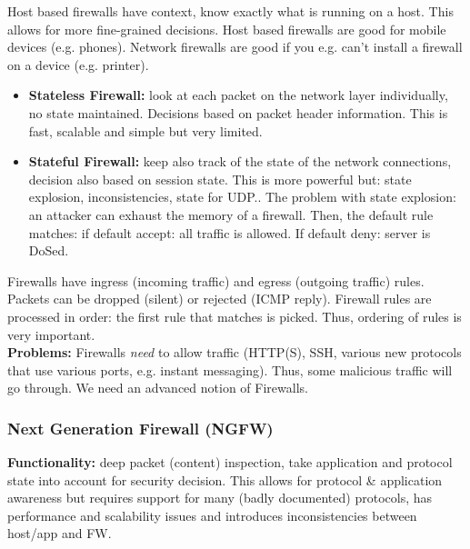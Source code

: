 \documentclass[11pt,oneside,a4paper]{article}
\begin{document}
\noindent Host based firewalls have context, know exactly what is running on a host. This allows for more fine-grained decisions. Host based firewalls are good for mobile devices (e.g. phones). Network firewalls are good if you e.g. can't install a firewall on a device (e.g. printer).\\

\vspace{-\topsep}
\begin{itemize}
	\setlength{\itemsep}{0pt}
	\setlength{\parskip}{0pt}
	\item \textbf{Stateless Firewall:} look at each packet on the network layer individually, no state maintained. Decisions based on packet header information. This is fast, scalable and simple but very limited.
	\item \textbf{Stateful Firewall:} keep also track of the state of the network connections, decision also based on session state. This is more powerful but: state explosion, inconsistencies, state for UDP.. The problem with state explosion: an attacker can exhaust the memory of a firewall. Then, the default rule matches: if default accept: all traffic is allowed. If default deny: server is DoSed.
\end{itemize}
\vspace{-\topsep}

Firewalls have ingress (incoming traffic) and egress (outgoing traffic) rules. Packets can be dropped (silent) or rejected (ICMP reply). Firewall rules are processed in order: the first rule that matches is picked. Thus, ordering of rules is very important.\\

\textbf{Problems:} Firewalls \textit{need} to allow traffic (HTTP(S), SSH, various new protocols that use various ports, e.g. instant messaging). Thus, some malicious traffic will go through. We need an advanced notion of Firewalls.

\subsubsection{Next Generation Firewall (NGFW)}

\textbf{Functionality:} deep packet (content) inspection, take application and protocol state into
account for security decision. This allows for protocol \& application awareness but requires support for many (badly documented) protocols, has performance and scalability issues and introduces inconsistencies between host/app and FW.
\end{document}

